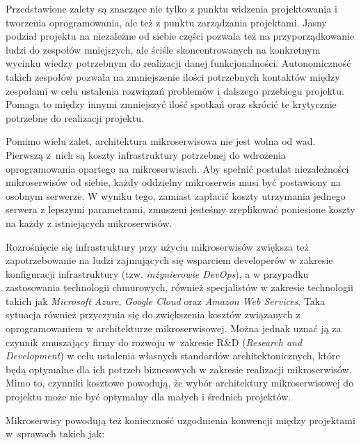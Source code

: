 \documentclass{SGGW-thesis}
\begin{document}
Przedstawione zalety są znaczące nie tylko z punktu widzenia projektowania i tworzenia oprogramowania, ale też z punktu zarządzania projektami. Jasny podział projektu na niezależne od siebie części pozwala też na przyporządkowanie ludzi do zespołów mniejszych, ale ściśle skoncentrowanych na konkretnym wycinku wiedzy potrzebnym do realizacji danej funkcjonalności.
Autonomiczność takich zespołów pozwala na zmniejszenie ilości potrzebnych kontaktów między zespołami w celu ustalenia rozwiązań problemów i dalszego przebiegu projektu. Pomaga to między innymi zmniejszyć ilość spotkań oraz skrócić te krytycznie potrzebne do realizacji projektu.

Pomimo wielu zalet, architektura mikroserwisowa nie jest wolna od wad. Pierwszą z~nich są koszty infrastruktury potrzebnej do wdrożenia oprogramowania opartego na mikroserwisach. Aby spełnić postulat niezależności mikroserwisów od siebie, każdy oddzielny mikroserwis musi być postawiony na osobnym serwerze. W wyniku tego, zamiast zapłacić koszty utrzymania jednego serwera z lepszymi parametrami, zmuszeni jesteśmy zreplikować poniesione koszty na każdy z istniejących mikroserwisów.

Rozrośnięcie się infrastruktury przy użyciu mikroserwisów zwiększa też zapotrzebowanie na ludzi zajmujących się wsparciem developerów w zakresie konfiguracji infrastruktury (tzw. \textit{inżynierowie DevOps}), a w przypadku zastosowania technologii chmurowych, również specjalistów w zakresie technologii takich jak \textit{Microsoft Azure}, \textit{Google Cloud} oraz \textit{Amazon Web Services}. Taka sytuacja również przyczynia się do zwiększenia kosztów związanych z oprogramowaniem w architekturze mikroserwisowej. Można jednak uznać ją za czynnik zmuszający firmy do rozwoju w~zakresie R\&D (\textit{Research and Development}) w celu ustalenia własnych standardów architektonicznych, które będą optymalne dla ich potrzeb biznesowych w zakresie realizacji mikroserwisów. Mimo to, czynniki kosztowe powodują, że wybór architektury mikroserwisowej do projektu może nie być optymalny dla małych i średnich projektów.

Mikroserwisy powodują też konieczność uzgodnienia konwencji między projektami w~sprawach takich jak:
\end{document}
